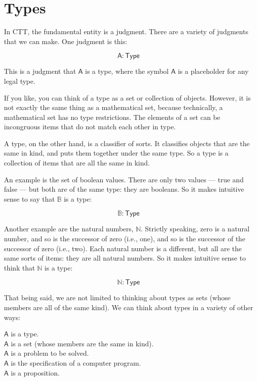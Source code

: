 \documentclass{article}
\newcommand\term{\mathsf}
\def\Type/{\term{Type}}
\def\Nat/{\mathbb{N}}
\def\Bool/{\mathbb{B}}
\begin{document}
\section{Types}

In CTT, the fundamental entity is a judgment. There are a variety of judgments that we can make. One judgment is this:

\begin{equation*}
  \term{A} : \Type/
\end{equation*}

This is a judgment that $\term{A}$ is a type, where the symbol $\term{A}$ is a placeholder for any legal type. 

If you like, you can think of a type as a set or collection of objects. However, it is not exactly the same thing as a mathematical set, because technically, a mathematical set has no type restrictions. The elements of a set can be incongruous items that do not match each other in type.

A type, on the other hand, is a classifier of sorts. It classifies objects that are the same in kind, and puts them together under the same type. So a type is a collection of items that are all the same in kind. 

An example is the set of boolean values. There are only two values --- true and false --- but both are of the same type: they are booleans. So it makes intuitive sense to say that $\Bool/$ is a type:

\begin{equation*}
  \Bool/ : \Type/
\end{equation*}

Another example are the natural numbers, $\Nat/$. Strictly speaking, zero is a natural number, and so is the successor of zero (i.e., one), and so is the successor of the successor of zero (i.e., two). Each natural number is a different, but all are the same sorts of items: they are all natural numbers. So it makes intuitive sense to think that $\Nat/$ is a type:

\begin{equation*}
  \Nat/ : \Type/
\end{equation*}

That being said, we are not limited to thinking about types as sets (whose members are all of the same kind). We can think about types in a variety of other ways:

\begin{center}
  $\term{A}$ is a type. \\
  $\term{A}$ is a set (whose members are the same in kind). \\
  $\term{A}$ is a problem to be solved. \\
  $\term{A}$ is the specification of a computer program. \\
  $\term{A}$ is a proposition.
\end{center}
\end{document}

